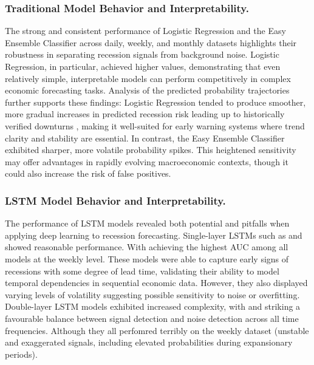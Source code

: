 \subsubsection{Traditional Model Behavior and Interpretability.}
The strong and consistent performance of Logistic Regression and the Easy Ensemble Classifier across daily, weekly, and monthly datasets highlights their robustness in separating recession signals from background noise. Logistic Regression, in particular, achieved higher \AUCone values, demonstrating that even relatively simple, interpretable models %
can perform competitively in complex economic forecasting tasks. Analysis of the predicted probability trajectories further supports these findings: Logistic Regression tended to produce smoother, more gradual increases in predicted recession risk leading up to historically verified downturns%
, making it well-suited for early warning systems where trend clarity and stability are essential. In contrast, the Easy Ensemble Classifier exhibited sharper, more volatile probability spikes. 
This heightened sensitivity may offer advantages in rapidly evolving macroeconomic contexts, though it could also increase the risk of false positives.




\subsubsection{LSTM Model Behavior and Interpretability.}
The performance of LSTM models revealed both potential and pitfalls when applying deep learning to recession forecasting. 
Single-layer LSTMs such as \LSTMF and \LSTME showed reasonable performance. 
With \LSTME achieving the highest AUC among all models at the weekly level. These models were able to capture early signs of recessions with some degree of lead time, validating their ability to model temporal dependencies in sequential economic data. However, they also displayed varying levels of volatility 
suggesting possible sensitivity to noise or overfitting.
Double-layer LSTM models exhibited increased complexity, with \LSTMFF and \LSTMEE striking a favourable balance between signal detection and noise detection across all time frequencies. Although they all perfomred terribly on the weekly dataset (unstable and exaggerated signals, including elevated probabilities during expansionary periods). 


